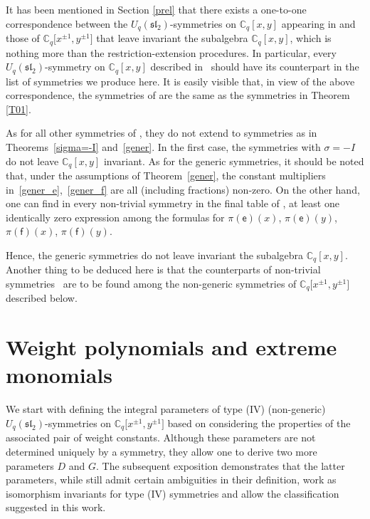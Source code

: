 \documentclass[pdftex]{sigma}
\numberwithin{equation}{section}
\begin{document}
\begin{Remark}It has been mentioned in Section \ref{prel} that there exists a one-to-one correspondence between the $U_q(\mathfrak{sl}_2)$-symmetries on $\mathbb{C}_q[x,y]$ appearing in \cite[Theorems 4.2--4.7]{DS} and those of $\mathbb{C}_q\big[x^{\pm 1},y^{\pm 1}\big]$ that leave invariant the subalgebra $\mathbb{C}_q[x,y]$, which is nothing more than the restriction-extension procedures. In particular, every $U_q(\mathfrak{sl}_2)$-symmetry on $\mathbb{C}_q[x,y]$ described in~\cite{DS} should have its counterpart in the list of symmetries we produce here. It is easily visible that, in view of the above correspondence, the symmetries of \cite[Theorem 4.2]{DS} are the same as the symmetries in Theorem \ref{T01}.

As for all other symmetries of \cite{DS}, they do not extend to symmetries as in Theorems~\ref{sigma=-I} and~\ref{gener}. In the first case, the symmetries with $\sigma=-I$ do not leave $\mathbb{C}_q[x,y]$ invariant. As for the generic symmetries, it should be noted that, under the assumptions of Theorem~\ref{gener}, the constant multipliers in~\eqref{gener_e},~\eqref{gener_f} are all (including fractions) non-zero. On the other hand, one can find in every non-trivial symmetry in the final table of \cite{DS}, at least one identically zero expression among the formulas for $\pi(\mathsf{e})(x)$, $\pi(\mathsf{e})(y)$, $\pi(\mathsf{f})(x)$, $\pi(\mathsf{f})(y)$.

Hence, the generic symmetries do not leave invariant the subalgebra $\mathbb{C}_q[x,y]$. Another thing to be deduced here is that the counterparts of non-trivial symmetries~\cite{DS} are to be found among the non-generic symmetries of $\mathbb{C}_q\big[x^{\pm 1},y^{\pm 1}\big]$ described below.
\end{Remark}


\section{Weight polynomials and extreme monomials}\label{wpem}

We start with defining the integral parameters of type (IV) (non-generic) $U_q(\mathfrak{sl}_2)$-symmetries on $\mathbb{C}_q\big[x^{\pm 1},y^{\pm 1}\big]$ based on considering the properties of the associated pair of weight constants. Although these parameters are not determined uniquely by a symmetry, they allow one to derive two more parameters $D$ and $G$. The subsequent exposition demonstrates that the latter para\-me\-ters, while still admit certain ambiguities in their definition, work as isomorphism invariants for type (IV) symmetries and allow the classification suggested in this work.
\end{document}
